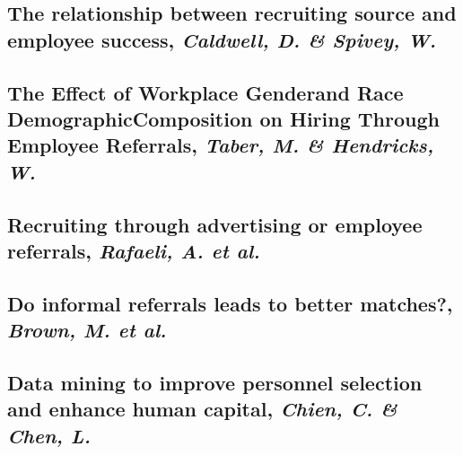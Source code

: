 \documentclass[a4paper, 11pt]{article} %
\begin{document}
\subsection*{The relationship between recruiting source and employee success, \emph{Caldwell, D. \& Spivey, W.} \cite{second}}

\subsection*{The Effect of Workplace Genderand Race DemographicComposition on Hiring Through Employee Referrals, \emph{Taber, M. \& Hendricks, W.} \cite{third}}

\subsection*{Recruiting through advertising or employee referrals, \emph{Rafaeli, A. et al.} \cite{fourth}}

\subsection*{Do informal referrals leads to better matches?, \emph{Brown, M. et al.} \cite{fifth}}

\subsection*{Data mining to improve personnel selection and enhance human capital, \emph{Chien, C. \& Chen, L.} \cite{sixth}}








\end{document}
